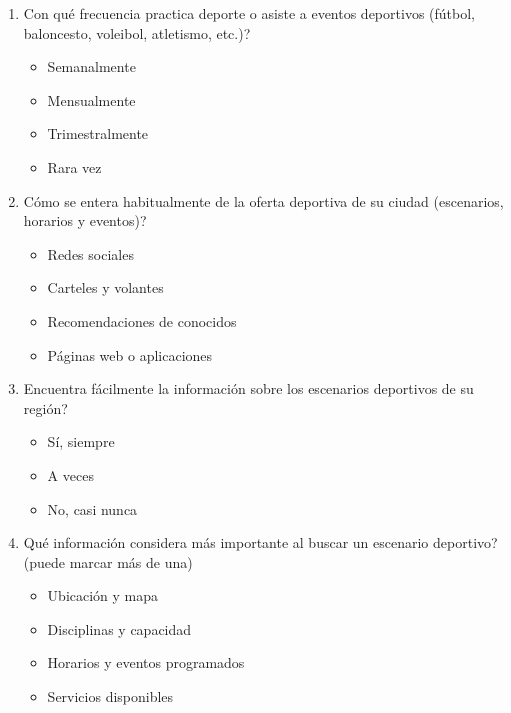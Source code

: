 \begin{enumerate}
  \item \textquestiondown Con qu\'e frecuencia practica deporte o asiste a
        eventos deportivos (f\'utbol, baloncesto, voleibol, atletismo, etc.)?
        \begin{itemize}
          \item[$\square$] Semanalmente
          \item[$\square$] Mensualmente
          \item[$\square$] Trimestralmente
          \item[$\square$] Rara vez
        \end{itemize}

  \item \textquestiondown C\'omo se entera habitualmente de la oferta
        deportiva de su ciudad (escenarios, horarios y eventos)?
        \begin{itemize}
          \item[$\square$] Redes sociales
          \item[$\square$] Carteles y volantes
          \item[$\square$] Recomendaciones de conocidos
          \item[$\square$] P\'aginas web o aplicaciones
        \end{itemize}

  \item \textquestiondown Encuentra f\'acilmente la informaci\'on sobre los
        escenarios deportivos de su regi\'on?
        \begin{itemize}
          \item[$\square$] S\'i, siempre
          \item[$\square$] A veces
          \item[$\square$] No, casi nunca
        \end{itemize}

  \item \textquestiondown Qu\'e informaci\'on considera m\'as importante al
        buscar un escenario deportivo? (puede marcar m\'as de una)
        \begin{itemize}
          \item[$\square$] Ubicaci\'on y mapa
          \item[$\square$] Disciplinas y capacidad
          \item[$\square$] Horarios y eventos programados
          \item[$\square$] Servicios disponibles
        \end{itemize}


\end{enumerate}
